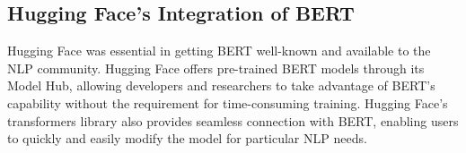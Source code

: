 \subsection{Hugging Face's Integration of BERT}

Hugging Face was essential in getting BERT well-known and available to the NLP community. Hugging Face offers pre-trained BERT models through its Model Hub, allowing developers and researchers to take advantage of BERT's capability without the requirement for time-consuming training. Hugging Face's transformers library also provides seamless connection with BERT, enabling users to quickly and easily modify the model for particular NLP needs.

